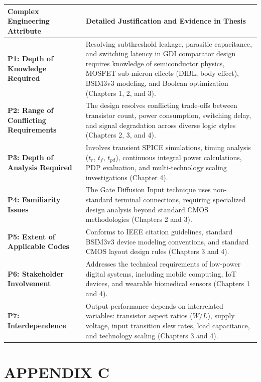 \documentclass[12pt,a4paper,oneside]{report}
\begin{document}
\begin{table}[H]
\centering
\begin{tabular}{|p{3.8cm}|p{9.8cm}|}
\hline
\textbf{Complex Engineering Attribute} & \textbf{Detailed Justification and Evidence in Thesis} \\
\hline
\textbf{P1: Depth of Knowledge Required} & Resolving subthreshold leakage, parasitic capacitance, and switching latency in GDI comparator design requires knowledge of semiconductor physics, MOSFET sub-micron effects (DIBL, body effect), BSIM3v3 modeling, and Boolean optimization (Chapters 1, 2, and 3). \\
\hline
\textbf{P2: Range of Conflicting Requirements} & The design resolves conflicting trade-offs between transistor count, power consumption, switching delay, and signal degradation across diverse logic styles (Chapters 2, 3, and 4). \\
\hline
\textbf{P3: Depth of Analysis Required} & Involves transient SPICE simulations, timing analysis ($t_r$, $t_f$, $t_{pd}$), continuous integral power calculations, PDP evaluation, and multi-technology scaling investigations (Chapter 4). \\
\hline
\textbf{P4: Familiarity Issues} & The Gate Diffusion Input technique uses non-standard terminal connections, requiring specialized design analysis beyond standard CMOS methodologies (Chapters 2 and 3). \\
\hline
\textbf{P5: Extent of Applicable Codes} & Conforms to IEEE citation guidelines, standard BSIM3v3 device modeling conventions, and standard CMOS layout design rules (Chapters 3 and 4). \\
\hline
\textbf{P6: Stakeholder Involvement} & Addresses the technical requirements of low-power digital systems, including mobile computing, IoT devices, and wearable biomedical sensors (Chapters 1 and 4). \\
\hline
\textbf{P7: Interdependence} & Output performance depends on interrelated variables: transistor aspect ratios ($W/L$), supply voltage, input transition slew rates, load capacitance, and technology scaling (Chapters 3 and 4). \\
\hline
\end{tabular}
\end{table}


\clearpage
\chapter*{APPENDIX C}
\end{document}
